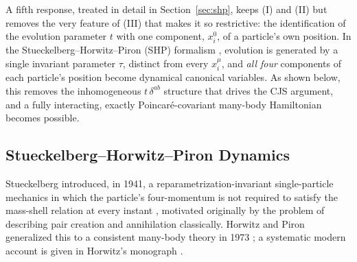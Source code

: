 A fifth response, treated in detail in Section~\ref{sec:shp}, keeps (I) and
(II) but removes the very feature of (III) that makes it so restrictive: the
identification of the evolution parameter $t$ with one component, $x_i^0$, of a
particle's own position. In the Stueckelberg--Horwitz--Piron (SHP) formalism
\cite{Horwitz2015}, evolution is generated by a single invariant parameter
$\tau$, distinct from every $x_i^\mu$, and \emph{all four} components of each
particle's position become dynamical canonical variables. As shown below, this
removes the inhomogeneous $t\,\delta^{ab}$ structure that drives the CJS
argument, and a fully interacting, exactly Poincar\'e-covariant many-body
Hamiltonian becomes possible.
\subsection{ Stueckelberg--Horwitz--Piron Dynamics}

Stueckelberg introduced, in 1941, a reparametrization-invariant single-particle
mechanics in which the particle's four-momentum is not required to satisfy the
mass-shell relation at every instant , motivated originally by the problem of
describing pair creation and annihilation classically. Horwitz and Piron
generalized this to a consistent many-body theory in 1973 ; a systematic modern
account is given in Horwitz's monograph \cite{Horwitz2015}.

